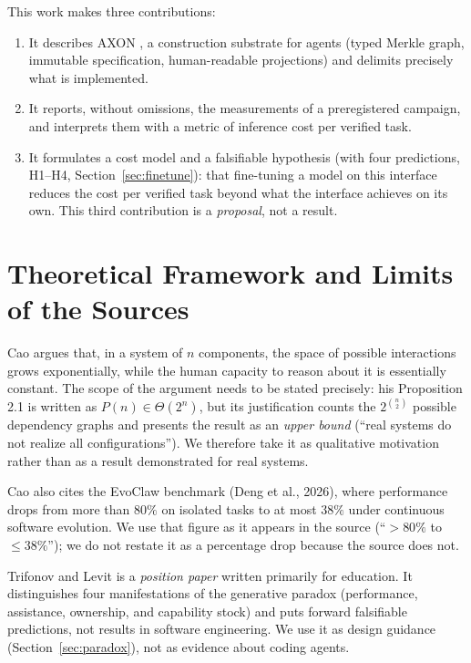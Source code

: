 \documentclass[11pt, a4paper]{article}
\newcommand{\pc}{\%}
\begin{document}
This work makes three contributions:
\begin{enumerate}[nosep]
  \item It describes AXON \cite{axon2026}, a construction substrate for agents (typed Merkle graph, immutable specification, human-readable projections) and delimits precisely what is implemented.
  \item It reports, without omissions, the measurements of a preregistered campaign, and interprets them with a metric of inference cost per verified task.
  \item It formulates a cost model and a falsifiable hypothesis (with four predictions, H1--H4, Section~\ref{sec:finetune}): that fine-tuning a model on this interface reduces the cost per verified task beyond what the interface achieves on its own. This third contribution is a \emph{proposal}, not a result.
\end{enumerate}

\section{Theoretical Framework and Limits of the Sources}
\label{sec:complexity}

Cao \cite{cao2026} argues that, in a system of $n$ components, the space of possible interactions grows exponentially, while the human capacity to reason about it is essentially constant. The scope of the argument needs to be stated precisely: his Proposition 2.1 is written as $P(n)\in\Theta(2^n)$, but its justification counts the $2^{\binom{n}{2}}$ possible dependency graphs and presents the result as an \emph{upper bound} (``real systems do not realize all configurations''). We therefore take it as qualitative motivation rather than as a result demonstrated for real systems.

Cao also cites the EvoClaw benchmark (Deng et al., 2026), where performance drops from more than $80\pc$ on isolated tasks to at most $38\pc$ under continuous software evolution. We use that figure as it appears in the source (``$>80\pc$ to $\le 38\pc$''); we do not restate it as a percentage drop because the source does not.

Trifonov and Levit \cite{trifonov2026} is a \emph{position paper} written primarily for education. It distinguishes four manifestations of the generative paradox (performance, assistance, ownership, and capability stock) and puts forward falsifiable predictions, not results in software engineering. We use it as design guidance (Section~\ref{sec:paradox}), not as evidence about coding agents.
\end{document}
